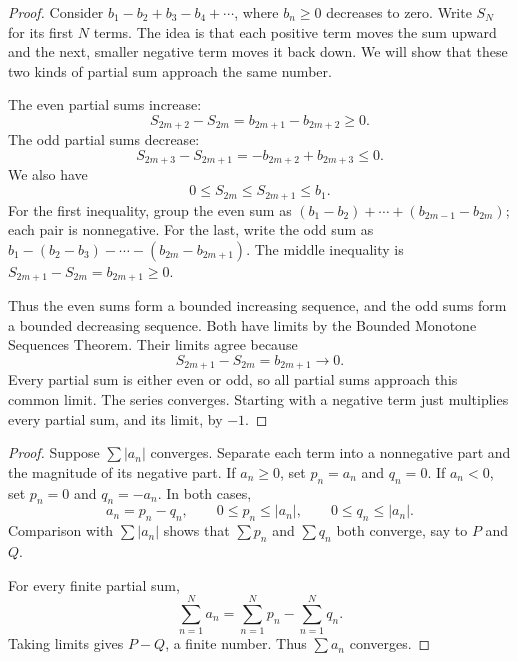 
\begin{proof}
Consider $b_1-b_2+b_3-b_4+\cdots$, where $b_n\geq0$ decreases to
zero. Write $S_N$ for its first $N$ terms. The idea is that each positive
term moves the sum upward and the next, smaller negative term moves it
back down. We will show that these two kinds of partial sum approach
the same number.

The even partial sums increase:
$$S_{2m+2}-S_{2m}=b_{2m+1}-b_{2m+2}\geq0.$$
The odd partial sums decrease:
$$S_{2m+3}-S_{2m+1}=-b_{2m+2}+b_{2m+3}\leq0.$$
We also have
$$0\leq S_{2m}\leq S_{2m+1}\leq b_1.$$
For the first inequality, group the even sum as
$(b_1-b_2)+\cdots+(b_{2m-1}-b_{2m})$; each pair is nonnegative.
For the last, write the odd sum as
$b_1-(b_2-b_3)-\cdots-(b_{2m}-b_{2m+1})$.
The middle inequality is $S_{2m+1}-S_{2m}=b_{2m+1}\geq0$.

Thus the even sums form a bounded increasing sequence, and the odd
sums form a bounded decreasing sequence. Both have limits by the
Bounded Monotone Sequences Theorem. Their limits agree because
$$S_{2m+1}-S_{2m}=b_{2m+1}\longrightarrow0.$$
Every partial sum is either even or odd, so all partial sums approach
this common limit. The series converges. Starting with a negative term
just multiplies every partial sum, and its limit, by $-1$.
\end{proof}


\begin{proof}
Suppose $\sum|a_n|$ converges. Separate each term into a nonnegative
part and the magnitude of its negative part. If $a_n\geq0$, set
$p_n=a_n$ and $q_n=0$. If $a_n<0$, set $p_n=0$ and $q_n=-a_n$.
In both cases,
$$a_n=p_n-q_n,\qquad 0\leq p_n\leq|a_n|,\qquad
0\leq q_n\leq|a_n|.$$
Comparison with $\sum|a_n|$ shows that $\sum p_n$ and $\sum q_n$
both converge, say to $P$ and $Q$.

For every finite partial sum,
$$\sum_{n=1}^N a_n=\sum_{n=1}^N p_n-\sum_{n=1}^N q_n.$$
Taking limits gives $P-Q$, a finite number. Thus $\sum a_n$ converges.
\end{proof}


